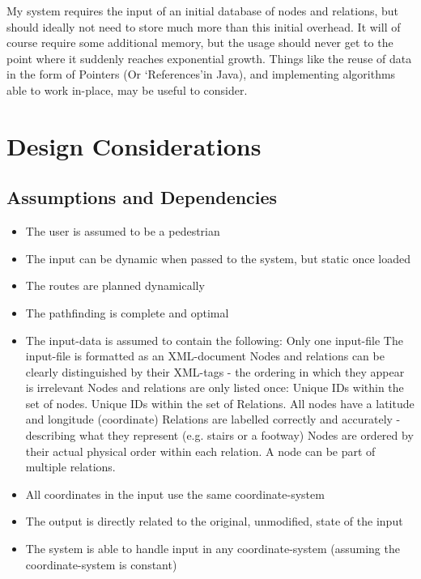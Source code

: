 \documentclass[conference]{IEEEtran}
\begin{document}
My system requires the input of an initial database of nodes and relations, but should ideally not need to store much more than this initial overhead.
It will of course require some additional memory, but the usage should never get to the point where it suddenly reaches exponential growth. Things like the reuse of data in the form of Pointers (Or \textquoteleft References\textquoteright in Java), and implementing algorithms able to work in-place, may be useful to consider.

\section{Design Considerations}


\subsection{Assumptions and Dependencies}

\begin{itemize}
	\item The user is assumed to be a pedestrian
	\item The input can be dynamic when passed to the system, but static once loaded
	\item The routes are planned dynamically
	\item The pathfinding is complete and optimal
	\item The input-data is assumed to contain the following:
	\subitem Only one input-file
	\subitem The input-file is formatted as an XML-document
	\subitem Nodes and relations can be clearly distinguished by their XML-tags - the ordering in which they appear is irrelevant
	\subitem Nodes and relations are only listed once:
	\subsubitem Unique IDs within the set of nodes.
	\subsubitem Unique IDs within the set of Relations.
	\subitem All nodes have a latitude and longitude (coordinate)
	\subitem Relations are labelled correctly and accurately - describing what they represent (e.g. stairs or a footway)
	\subitem Nodes are ordered by their actual physical order within each relation.
	\subitem A node can be part of multiple relations.
	
	\item All coordinates in the input use the same coordinate-system
	\item The output is directly related to the original, unmodified, state of the input
	\item The system is able to handle input in any coordinate-system (assuming the coordinate-system is constant)
	
\end{itemize}
\end{document}
